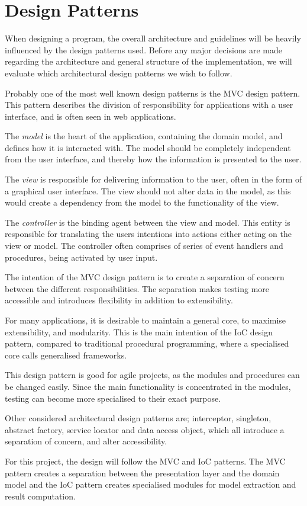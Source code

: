 \section{Design Patterns}\label{ssec:DesignPattern}

When designing a program, the overall architecture and guidelines will be heavily influenced by the design patterns used. Before any major decisions are made regarding the architecture and general structure of the implementation, we will evaluate which architectural design patterns we wish to follow.

Probably one of the most well known design patterns is the MVC design pattern. This pattern describes the division of responsibility for applications with a user interface, and is often seen in web applications.

The \emph{model} is the heart of the application, containing the domain model, and defines how it is interacted with. The model should be completely independent from the user interface, and thereby how the information is presented to the user.

The \emph{view} is responsible for delivering information to the user, often in the form of a graphical user interface. The view should not alter data in the model, as this would create a dependency from the model to the functionality of the view.

The \emph{controller} is the binding agent between the view and model. This entity is responsible for translating the users intentions into actions either acting on the view or model. The controller often comprises of series of event handlers and procedures, being activated by user input.

The intention of the MVC design pattern is to create a separation of concern between the different responsibilities. The separation makes testing more accessible and introduces flexibility in addition to extensibility. 

For many applications, it is desirable to maintain a general core, to maximise extensibility, and modularity. This is the main intention of the IoC design pattern, compared to traditional procedural programming, where a specialised core calls generalised frameworks. 

This design pattern is good for agile projects, as the modules and procedures can be changed easily. Since the main functionality is concentrated in the modules, testing can become more specialised to their exact purpose.

\vspace{5mm}

Other considered architectural design patterns are; interceptor, singleton, abstract factory, service locator and data access object, which all introduce a separation of concern, and alter accessibility. 

\vspace{1cm}

For this project, the design will follow the MVC and IoC patterns. The MVC pattern creates a separation between the presentation layer and the domain model and the IoC pattern creates specialised modules for model extraction and result computation.